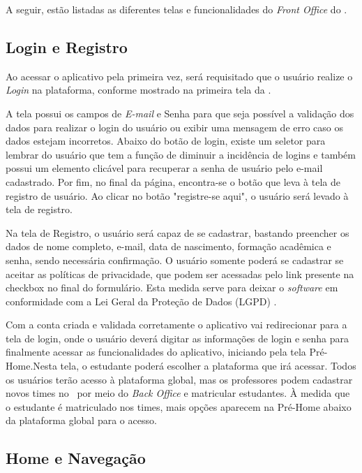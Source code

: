 A seguir, estão listadas as diferentes telas e funcionalidades do \textit{Front Office} do \appName.

\subsection{Login e Registro}

Ao acessar o aplicativo pela primeira vez, será requisitado que o usuário realize o \textit{Login} na plataforma, conforme mostrado na primeira tela da .


A tela possui os campos de \textit{E-mail} e Senha para que seja possível a validação dos dados para realizar o login do usuário ou exibir uma mensagem de erro caso os dados estejam incorretos. Abaixo do botão de login, existe um seletor para lembrar do usuário que tem a função de diminuir a incidência de logins e também possui um elemento clicável para recuperar a senha de usuário pelo e-mail cadastrado. Por fim, no final da página, encontra-se o botão que leva à tela de registro de usuário. Ao clicar no botão "registre-se aqui", o usuário será levado à tela de registro.

Na tela de Registro, o usuário será capaz de se cadastrar, bastando preencher os dados de nome completo, e-mail, data de nascimento, formação acadêmica e senha, sendo necessária confirmação. O usuário somente poderá se cadastrar se aceitar as políticas de privacidade, que podem ser acessadas pelo link presente na checkbox no final do formulário. Esta medida serve para deixar o \textit{software} em conformidade com a Lei Geral da Proteção de Dados (LGPD) \cite{lgpd}.

Com a conta criada e validada corretamente o aplicativo vai redirecionar para a tela de login, onde o usuário deverá digitar as informações de login e senha para finalmente acessar as funcionalidades do aplicativo, iniciando pela tela Pré-Home.Nesta tela, o estudante poderá escolher a plataforma que irá acessar. Todos os usuários terão acesso à plataforma global, mas os professores podem cadastrar novos times no \appName\ por meio do \textit{Back Office} e matricular estudantes. À medida que o estudante é matriculado nos times, mais opções aparecem na Pré-Home abaixo da plataforma global para o acesso.

\subsection{Home e Navegação}
\label{home_navegacao}

